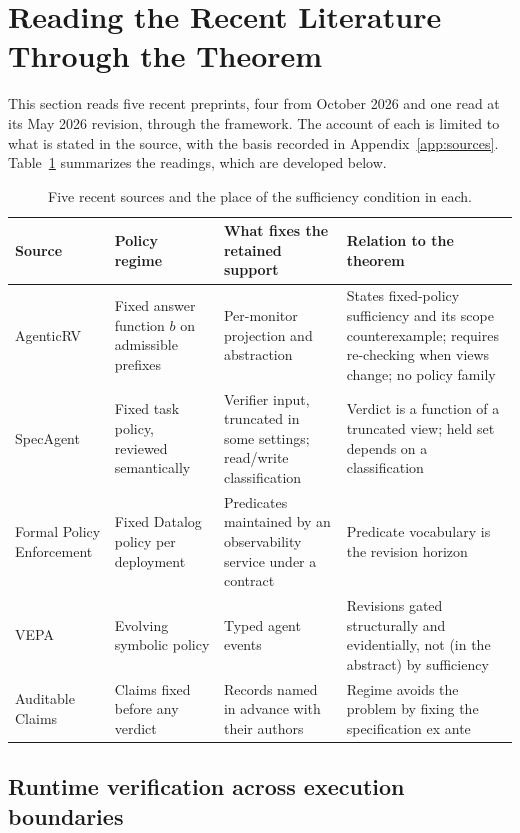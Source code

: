 \documentclass[11pt]{article}
\theoremstyle{definition}
\theoremstyle{remark}
\begin{document}
\section{Reading the Recent Literature Through the Theorem}\label{sec:literature}

This section reads five recent preprints, four from October 2026 and one read at its May 2026 revision, through the framework. The account of each is limited to what is stated in the source, with the basis recorded in Appendix~\ref{app:sources}. Table~\ref{tab:sources} summarizes the readings, which are developed below.

\begin{table}[t]
\centering
\small
\begin{tabular}{@{}p{2.55cm}p{3.0cm}p{3.6cm}p{4.2cm}@{}}
\toprule
Source & Policy regime & What fixes the retained support & Relation to the theorem \\
\midrule
AgenticRV \cite{agenticrv} & Fixed answer function $b$ on admissible prefixes & Per-monitor projection and abstraction & States fixed-policy sufficiency and its scope counterexample; requires re-checking when views change; no policy family \\
SpecAgent \cite{specagent} & Fixed task policy, reviewed semantically & Verifier input, truncated in some settings; read/write classification & Verdict is a function of a truncated view; held set depends on a classification \\
Formal Policy Enforcement \cite{fpe} & Fixed Datalog policy per deployment & Predicates maintained by an observability service under a contract & Predicate vocabulary is the revision horizon \\
VEPA \cite{vepa} & Evolving symbolic policy & Typed agent events & Revisions gated structurally and evidentially, not (in the abstract) by sufficiency \\
Auditable Claims \cite{auditable} & Claims fixed before any verdict & Records named in advance with their authors & Regime avoids the problem by fixing the specification ex ante \\
\bottomrule
\end{tabular}
\caption{Five recent sources and the place of the sufficiency condition in each.}
\label{tab:sources}
\end{table}

\subsection{Runtime verification across execution boundaries}
\end{document}
